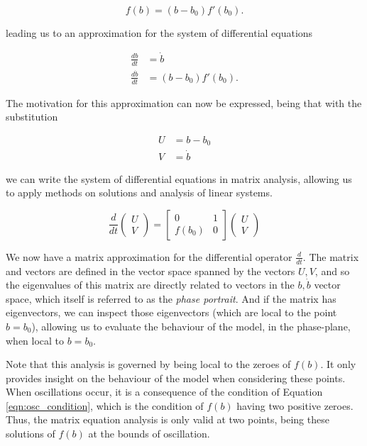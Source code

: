 \documentclass{article}
\begin{document}
\begin{equation}
    f(b) = (b-b_0)f'(b_0).
\end{equation}

leading us to an approximation for the system of differential equations

\begin{align}
    \frac{db}{dt} &= \dot{b} \\
    \frac{d\dot{b}}{dt} &= (b-b_0)f'(b_0).
\end{align}

The motivation for this approximation can now be expressed,
being that with the substitution

\begin{align}
    U &= b - b_0 \\
    V &= \dot{b}
\end{align}

we can write the system of differential equations in matrix analysis,
allowing us to apply methods on solutions and analysis of linear systems.

\begin{equation}
    \frac{d}{dt}\begin{pmatrix}
        U \\
        V
    \end{pmatrix} = \begin{bmatrix}
        0 & 1 \\
        f(b_0) & 0
    \end{bmatrix} \begin{pmatrix}
        U \\
        V
    \end{pmatrix}
    \label{eqn:matrix}
\end{equation}

We now have a matrix approximation for the differential operator $\frac{d}{dt}$.
The matrix and vectors are defined in the vector space spanned by the vectors $U,V$,
and so the eigenvalues of this matrix are directly related to vectors in the $b,\dot{b}$ vector space,
which itself is referred to as the \textit{phase portrait}.
And if the matrix has eigenvectors, we can inspect those eigenvectors (which are local to the point $b=b_0$),
allowing us to evaluate the behaviour of the model, in the phase-plane,
when local to $b=b_0$.

Note that this analysis is governed by being local to the zeroes of $f(b)$.
It only provides insight on the behaviour of the model when considering these points.
When oscillations occur, it is a consequence of the condition of Equation \ref{eqn:osc_condition},
which is the condition of $f(b)$ having two positive zeroes.
Thus, the matrix equation analysis is only valid at two points,
being these solutions of $f(b)$ at the bounds of oscillation.
\end{document}
